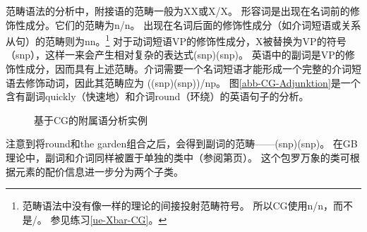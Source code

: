 范畴语法的分析中，附接语的范畴一般为X\bs X或X/X。
形容词是出现在名词前的修饰性成分。它们的范畴为n/n。
出现在名词后面的修饰性成分（如介词短语或关系从句）的范畴则为n\bs n。\footnote{%
  范畴语法中没有像\xbarc 一样的\xbarc 理论的间接投射范畴符号。
  所以CG使用n/n，而不是\nbarc/\nbarc。
  参见练习\ref{ue-Xbar-CG}。
} 
对于动词短语VP的修饰性成分，X被替换为VP的符号（s\bs np），这样一来会产生相对复杂的表达式(s\bs np)\bs (s\bs np)。
英语中的副词是VP的修饰性成分，因而具有上述范畴。介词需要一个名词短语才能形成一个完整的介词短语去修饰动词，因此其范畴应为
((s\bs np)\bs (s\bs np))/np。
图\vref{abb-CG-Adjunktion}是一个含有副词quickly（快速地）和介词round（环绕）的英语句子的分析。
%
\begin{figure}
\caption{\label{abb-CG-Adjunktion}基于CG的附属语分析实例}
\end{figure}%
注意到将round和the garden组合之后，会得到副词的范畴——(s\bs np)\bs (s\bs np)。
在GB理论中，副词和介词同样被置于单独的类中（参阅第\pageref{Seite-Adverbien-PP}页）。
这个包罗万象的类可根据元素的配价信息进一步分为两个子类。

